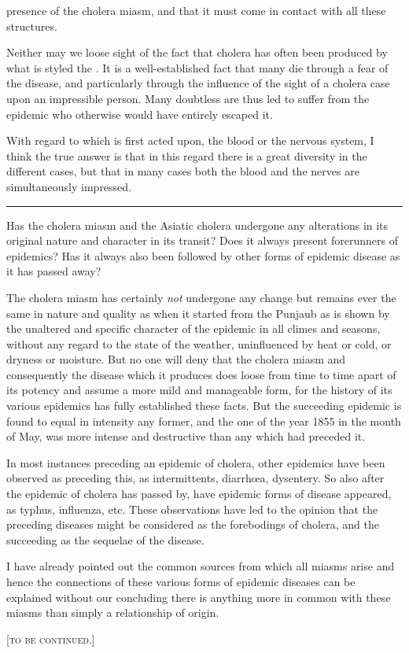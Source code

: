 presence of the cholera miasm, and that it must come in contact with
all these structures.

Neither may we loose sight of the fact that cholera has often been
produced by what is styled the . It is a well-established
fact that many die through a fear of the disease, and particularly
through the influence of the sight of a cholera case upon an
impressible person. Many doubtless are thus led to suffer from the
epidemic who otherwise would have entirely escaped it.

With regard to which is first acted upon, the blood or the nervous
system, I think the true answer is that in this regard there is a great
diversity in the different cases, but that in many cases both the blood
and the nerves are simultaneously impressed.

\plainbreak{1}

Has the cholera miasm and the Asiatic cholera undergone any alterations
in its original nature and character in its transit? Does it always
present forerunners of epidemics? Has it always also been followed by
other forms of epidemic disease as it has passed away?

The cholera miasm has certainly \emph{not} undergone any change but remains
ever the same in nature and quality as when it started from the
Punjaub as is shown by the unaltered and specific character of the epidemic
in all climes and seasons, without any regard to the state of the
weather, uninfluenced by heat or cold, or dryness or moisture. But no
one will deny that the cholera miasm and consequently the disease
which it produces does loose from time to time apart of its potency and
assume a more mild and manageable form, for the history of its various
epidemics has fully established these facts. But the succeeding epidemic
is found to equal in intensity any former, and the one of the year
1855 in the month of May, was more intense and destructive than any
which had preceded it.

In most instances preceding an epidemic of cholera, other epidemics
have been observed as preceding this, as intermittents, diarrhœa, dysentery.
So also after the epidemic of cholera has passed by, have
epidemic forms of disease appeared, as typhus, influenza, etc. These
observations have led to the opinion that the preceding diseases might
be considered as the forebodings of cholera, and the succeeding as the
sequelae of the disease.

I have already pointed out the common sources from which all
miasms arise and hence the connections of these various forms of epidemic
diseases can be explained without our concluding there is anything
more in common with these miasms than simply a relationship
of origin.

\begin{center}\textsc{[to be continued.]}\end{center}\endinput